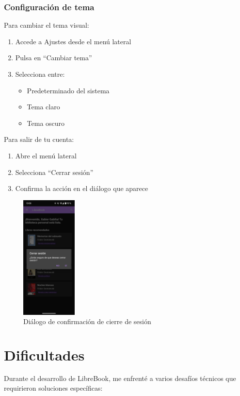 \documentclass[a4paper,10pt]{report}
\begin{document}
    \subsection{Configuración de tema}
    
    Para cambiar el tema visual:
    \begin{enumerate}
      \item Accede a Ajustes desde el menú lateral
      \item Pulsa en ``Cambiar tema''
      \item Selecciona entre:
      \begin{itemize}
        \item Predeterminado del sistema
        \item Tema claro
        \item Tema oscuro
      \end{itemize}
    \end{enumerate}    
    
    Para salir de tu cuenta:
    \begin{enumerate}
      \item Abre el menú lateral
      \item Selecciona ``Cerrar sesión''
      \item Confirma la acción en el diálogo que aparece
    \end{enumerate}
    
    \begin{figure}[H]
      \centering
      \includegraphics[width=0.25\textwidth]{.img/logout.png}
      \caption{Diálogo de confirmación de cierre de sesión}
      \label{fig:logout}
    \end{figure} 
  \chapter{Dificultades}
    Durante el desarrollo de LibreBook, me enfrenté a varios desafíos técnicos que requirieron soluciones específicas:
    
\end{document}
